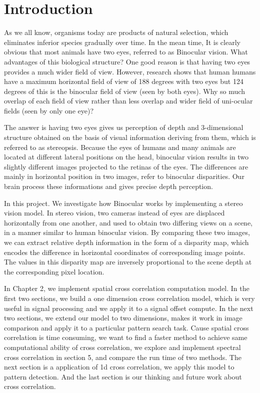 \chapter{Introduction}\label{part:into}

As we all know, organisms today are products of natural selection, which eliminates inferior species gradually over time. In the mean time, It is clearly obvious that most animals have two eyes, referred to as Binocular vision. What advantages of this biological structure? One good reason is that having two eyes provides a much wider field of view. However, research shows that human humans have a maximum horizontal field of view of 188 degrees with two eyes but 124 degrees of this is the binocular field of view (seen by both eyes). Why so much overlap of each field of view rather than less overlap and wider field of uni-ocular fields (seen by only one eye)? 

The answer is having two eyes gives us perception of depth and 3-dimensional structure obtained on the basis of visual information deriving from them, which is referred to as stereopsis. Because the eyes of humans and many animals are located at different lateral positions on the head, binocular vision results in two slightly different images projected to the retinas of the eyes. The differences are mainly in horizontal position in two images, refer to binocular disparities. Our brain process these informations and gives precise depth perception.

In this project. We investigate how Binocular works by implementing a stereo vision model. In stereo vision, two cameras instead of eyes are displaced horizontally from one another, and used to obtain two differing views on a scene, in a manner similar to human binocular vision. By comparing these two images, we can extract relative depth information in the form of a disparity map, which encodes the difference in horizontal coordinates of corresponding image points. The values in this disparity map are inversely proportional to the scene depth at the corresponding pixel location.

In Chapter 2, we implement spatial cross correlation computation model. In the first two sections, we build a one dimension cross correlation model, which is very useful in signal processing and we apply it to a signal offset compute. In the next two sections, we extend our model to two dimensions, makes it work in image comparison and apply it to a particular pattern search task. Cause spatial cross correlation is time consuming, we want to find a faster method to achieve same computational ability of cross correlation, we explore and implement spectral cross correlation in section 5, and compare the run time of two methods. The next section is a application of 1d cross correlation, we apply this model to pattern detection. And the last section is our thinking and  future work about cross correlation.

